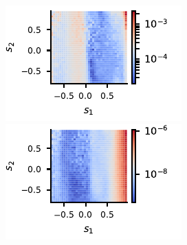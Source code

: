 \documentclass[twocolumn,showpacs,preprintnumbers,nofootinbib,prd,
superscriptaddress,10pt]{revtex4-1}
\begin{document}
\begin{figure}[t]
\begin{minipage}{\linewidth}
\begin{minipage}{\minipagesize\linewidth}
		\end{minipage}
    \end{minipage}\hfill
    \begin{minipage}{\linewidth}
        \centering
	 	\begin{minipage}{\minipagesize\linewidth}
		    \centering
		    \includegraphics[width=\linewidth]{img/F_countour_spins.pdf}
		\end{minipage}\hfill
		\begin{minipage}{\minipagesize\linewidth}
		    \centering
		    \includegraphics[width=\linewidth]{img/mse_countour_spins.pdf}
		\end{minipage}
    \end{minipage}\hfill
    \begin{minipage}{\linewidth}
        \centering
	 	\begin{minipage}{\minipagesize\linewidth}
		    \centering

\end{minipage}
\end{minipage}
\end{figure}
\end{document}
